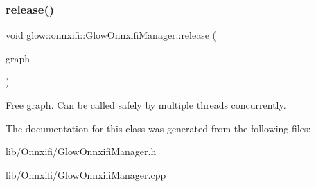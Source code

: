 \subsubsection{\texorpdfstring{release()}{release()}\hspace{0.1cm}{\footnotesize\ttfamily [3/3]}}
{\footnotesize\ttfamily void glow\+::onnxifi\+::\+Glow\+Onnxifi\+Manager\+::release (\begin{DoxyParamCaption}\item[{\hyperlink{classglow_1_1onnxifi_1_1_graph}{Graph\+Ptr}}]{graph }\end{DoxyParamCaption})}

Free {\ttfamily graph}. Can be called safely by multiple threads concurrently. 

The documentation for this class was generated from the following files\+:\begin{DoxyCompactItemize}
\item 
lib/\+Onnxifi/Glow\+Onnxifi\+Manager.\+h\item 
lib/\+Onnxifi/Glow\+Onnxifi\+Manager.\+cpp\end{DoxyCompactItemize}
